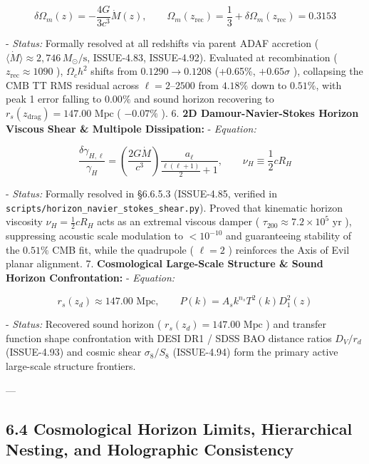 \documentclass[11pt,a4paper]{article}
\theoremstyle{definition}
\theoremstyle{remark}
\begin{document}
\begin{equation}
\delta\Omega_m(z) = -\frac{4G}{3c^3} \dot{M}(z), \qquad \Omega_m(z_{\text{rec}}) = \frac{1}{3} + \delta\Omega_m(z_{\text{rec}}) = 0.3153
\end{equation}


- \textit{Status:} Formally resolved at all redshifts via parent ADAF accretion ( $\langle\dot{M}\rangle \approx 2{,}746\,M_\odot/\text{s}$, ISSUE-4.83, ISSUE-4.92). Evaluated at recombination ( $z_{\text{rec}} \approx 1090$ ), $\Omega_c h^2$ shifts from $0.1290 \to 0.1208$ (+0.65\%, $+0.65\sigma$ ), collapsing the CMB TT RMS residual across $\ell = 2\text{--}2500$ from $4.18\%$ down to \textbf{$0.51\%$}, with peak 1 error falling to $0.00\%$ and sound horizon recovering to $r_s(z_{\text{drag}}) = 147.00\text{ Mpc}$ ( $-0.07\%$ ).
6. \textbf{2D Damour-Navier-Stokes Horizon Viscous Shear \& Multipole Dissipation:}
- \textit{Equation:}


\begin{equation}
\frac{\delta\gamma_{H, \ell}}{\gamma_H} = \left( \frac{2 G \dot{M}}{c^3} \right) \frac{a_\ell}{\frac{\ell(\ell + 1)}{2} + 1}, \qquad \nu_H \equiv \frac{1}{2} c R_H
\end{equation}


- \textit{Status:} Formally resolved in \S 6.6.5.3 (ISSUE-4.85, verified in \texttt{scripts/horizon_navier_stokes_shear.py}). Proved that kinematic horizon viscosity $\nu_H = \frac{1}{2} c R_H$ acts as an extremal viscous damper ( $\tau_{200} \approx 7.2 \times 10^5\text{ yr}$ ), suppressing acoustic scale modulation to $< 10^{-10}$ and guaranteeing stability of the $0.51\%$ CMB fit, while the quadrupole ( $\ell = 2$ ) reinforces the Axis of Evil planar alignment.
7. \textbf{Cosmological Large-Scale Structure \& Sound Horizon Confrontation:}
- \textit{Equation:}


\begin{equation}
r_s(z_d) \approx 147.00\text{ Mpc}, \qquad P(k) = A_s k^{n_s} T^2(k) D_1^2(z)
\end{equation}


- \textit{Status:} Recovered sound horizon ( $r_s(z_d) = 147.00\text{ Mpc}$ ) and transfer function shape confrontation with DESI DR1 / SDSS BAO distance ratios $D_V/r_d$ (ISSUE-4.93) and cosmic shear $\sigma_8 / S_8$ (ISSUE-4.94) form the primary active large-scale structure frontiers.

---

\subsection{6.4 Cosmological Horizon Limits, Hierarchical Nesting, and Holographic Consistency}
\end{document}
